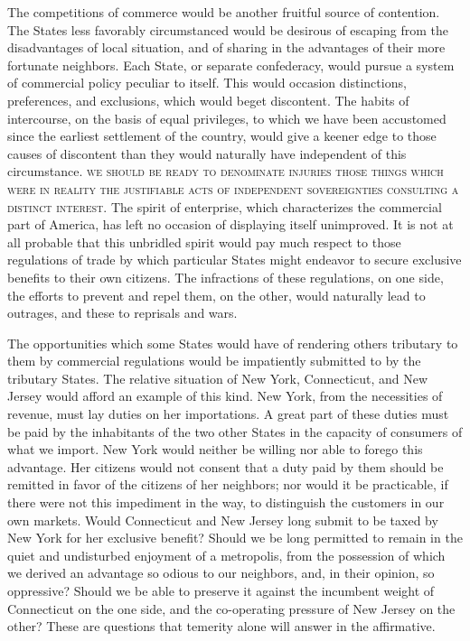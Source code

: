 The competitions of commerce would be another fruitful source of contention. The States less favorably circumstanced would be desirous of escaping from the disadvantages of local situation, and of sharing in the advantages of their more fortunate neighbors. Each State, or separate confederacy, would pursue a system of commercial policy peculiar to itself. This would occasion distinctions, preferences, and exclusions, which would beget discontent. The habits of intercourse, on the basis of equal privileges, to which we have been accustomed since the earliest settlement of the country, would give a keener edge to those causes of discontent than they would naturally have independent of this circumstance. \textsc{we should be ready to denominate injuries those things which were in reality the justifiable acts of independent sovereignties consulting a distinct interest}. The spirit of enterprise, which characterizes the commercial part of America, has left no occasion of displaying itself unimproved. It is not at all probable that this unbridled spirit would pay much respect to those regulations of trade by which particular States might endeavor to secure exclusive benefits to their own citizens. The infractions of these regulations, on one side, the efforts to prevent and repel them, on the other, would naturally lead to outrages, and these to reprisals and wars.

The opportunities which some States would have of rendering others tributary to them by commercial regulations would be impatiently submitted to by the tributary States. The relative situation of New York, Connecticut, and New Jersey would afford an example of this kind. New York, from the necessities of revenue, must lay duties on her importations. A great part of these duties must be paid by the inhabitants of the two other States in the capacity of consumers of what we import. New York would neither be willing nor able to forego this advantage. Her citizens would not consent that a duty paid by them should be remitted in favor of the citizens of her neighbors; nor would it be practicable, if there were not this impediment in the way, to distinguish the customers in our own markets. Would Connecticut and New Jersey long submit to be taxed by New York for her exclusive benefit? Should we be long permitted to remain in the quiet and undisturbed enjoyment of a metropolis, from the possession of which we derived an advantage so odious to our neighbors, and, in their opinion, so oppressive? Should we be able to preserve it against the incumbent weight of Connecticut on the one side, and the co-operating pressure of New Jersey on the other? These are questions that temerity alone will answer in the affirmative.

